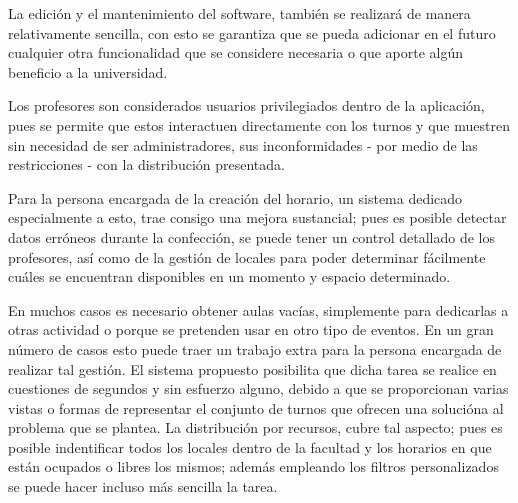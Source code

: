 \begin{introduction}
	La edición y el mantenimiento del software, también se realizará de manera relativamente sencilla, con esto se garantiza que se pueda adicionar en el futuro cualquier otra funcionalidad que se considere necesaria o que aporte algún beneficio a la universidad. 
	
	Los profesores son considerados usuarios privilegiados dentro de la aplicación, pues se permite que estos interactuen directamente con los turnos y que muestren sin necesidad de ser administradores, sus inconformidades - por medio de las restricciones -  con la distribución presentada.
	
	Para la persona encargada de la creación del horario, un sistema dedicado especialmente a esto, trae consigo una mejora sustancial; pues es posible detectar datos erróneos durante la confección, se puede tener un control detallado de los profesores, así como de la gestión de locales para poder determinar fácilmente cuáles se encuentran disponibles en un momento y espacio determinado.
	
	En muchos casos es necesario obtener aulas vacías, simplemente para dedicarlas a otras actividad o porque se pretenden usar en otro tipo de eventos. En un gran número de casos esto puede traer un trabajo extra para la persona encargada de realizar tal gestión. El sistema propuesto posibilita que dicha tarea se realice en cuestiones de segundos y sin esfuerzo alguno, debido a que se proporcionan varias vistas o formas de representar el conjunto de turnos que ofrecen una solucióna al problema que se plantea. La distribución por recursos, cubre tal aspecto; pues es posible indentificar todos los locales dentro de la facultad y los horarios en que están ocupados o libres los mismos; además empleando los filtros personalizados se puede hacer incluso más sencilla la tarea.

	

\end{introduction}
